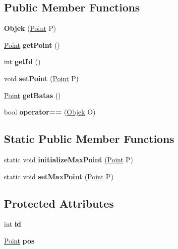 \subsection*{Public Member Functions}
\begin{DoxyCompactItemize}
\item 
\mbox{\label{class_objek_a8b3edd96c47dd89f616feccb56390af9}} 
{\bfseries Objek} (\mbox{\hyperlink{class_point}{Point}} P)
\item 
\mbox{\label{class_objek_a544b78e0a79f9f99b1ac8271c6fa4972}} 
\mbox{\hyperlink{class_point}{Point}} {\bfseries get\+Point} ()
\item 
\mbox{\label{class_objek_ac41425d23ee5fd6d9a74b32470d9ea57}} 
int {\bfseries get\+Id} ()
\item 
\mbox{\label{class_objek_a557437419b822a9b535c791b59db5a29}} 
void {\bfseries set\+Point} (\mbox{\hyperlink{class_point}{Point}} P)
\item 
\mbox{\label{class_objek_abccef8e9b61b3ccee04c812da69345f9}} 
\mbox{\hyperlink{class_point}{Point}} {\bfseries get\+Batas} ()
\item 
\mbox{\label{class_objek_a3e0a75a56419dff5258f4603750bc5f1}} 
bool {\bfseries operator==} (\mbox{\hyperlink{class_objek}{Objek}} O)
\end{DoxyCompactItemize}
\subsection*{Static Public Member Functions}
\begin{DoxyCompactItemize}
\item 
\mbox{\label{class_objek_a4a83ce5b1fb538f6700c7d804b83d428}} 
static void {\bfseries initialize\+Max\+Point} (\mbox{\hyperlink{class_point}{Point}} P)
\item 
\mbox{\label{class_objek_a2e34d2cd634f680f10b0c72af5764128}} 
static void {\bfseries set\+Max\+Point} (\mbox{\hyperlink{class_point}{Point}} P)
\end{DoxyCompactItemize}
\subsection*{Protected Attributes}
\begin{DoxyCompactItemize}
\item 
\mbox{\label{class_objek_aefee1657485871dd407ef4866364b821}} 
int {\bfseries id}
\item 
\mbox{\label{class_objek_aca6817c5aff91ab98bda2c024a269428}} 
\mbox{\hyperlink{class_point}{Point}} {\bfseries pos}
\end{DoxyCompactItemize}
